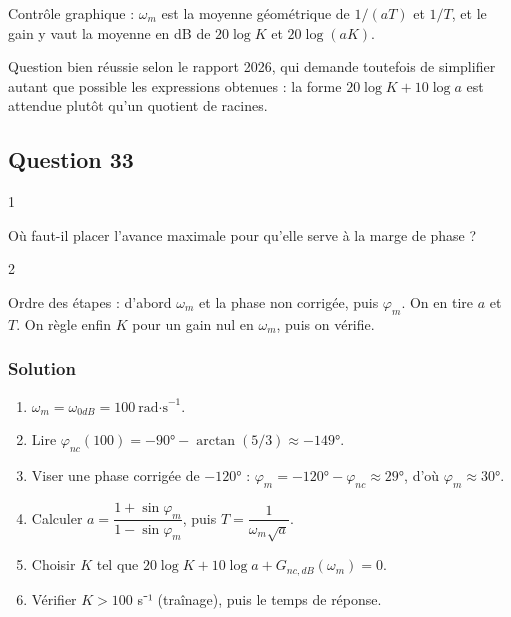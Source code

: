 \documentclass[11pt,a4paper]{article}
\providecommand{\tightlist}{\setlength{\itemsep}{0pt}\setlength{\parskip}{0pt}}
\begin{document}
\begin{methode}

Contrôle graphique : \(\omega_m\) est la moyenne géométrique de \(1/(aT)\) et \(1/T\), et le gain y vaut la moyenne en dB de \(20\log K\) et \(20\log(aK)\).

\end{methode}

\begin{jury}

Question bien réussie selon le rapport 2026, qui demande toutefois de simplifier autant que possible les expressions obtenues : la forme \(20\log K + 10\log a\) est attendue plutôt qu'un quotient de racines.

\end{jury}

\hypertarget{question-33}{%
\subsection{Question 33}\label{question-33}}

\begin{indication}{1}

Où faut-il placer l'avance maximale pour qu'elle serve à la marge de phase ?

\end{indication}

\begin{indication}{2}

Ordre des étapes : d'abord \(\omega_m\) et la phase non corrigée, puis \(\varphi_m\). On en tire \(a\) et \(T\). On règle enfin \(K\) pour un gain nul en \(\omega_m\), puis on vérifie.

\end{indication}

\hypertarget{solution-32}{%
\subsubsection{Solution}\label{solution-32}}

\begin{enumerate}
\def\labelenumi{\arabic{enumi}.}
\tightlist
\item
  \(\boxed{\omega_m = \omega_{0dB} = 100\ \text{rad·s}^{-1}}\).
\item
  Lire \(\varphi_{nc}(100) = -90° - \arctan(5/3)\approx -149°\).
\item
  Viser une phase corrigée de \(-120°\) : \(\varphi_m = -120° - \varphi_{nc}\approx 29°\), d'où \(\boxed{\varphi_m\approx 30°}\).
\item
  Calculer \(a = \dfrac{1+\sin\varphi_m}{1-\sin\varphi_m}\), puis \(T = \dfrac{1}{\omega_m\sqrt a}\).
\item
  Choisir \(K\) tel que \(20\log K + 10\log a + G_{nc,dB}(\omega_m) = 0\).
\item
  Vérifier \(K > 100\) s⁻¹ (traînage), puis le temps de réponse.
\end{enumerate}
\end{document}
